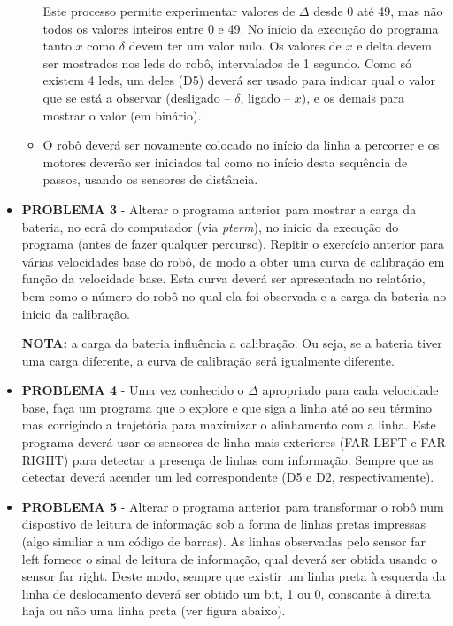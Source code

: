 \documentclass[a4paper, 12pt, onecolumn, oneside]{report}
\begin{document}
\begin{itemize}
\begin{itemize}
Este processo permite experimentar valores de $ \Delta $ desde 0 até 49, mas não todos os valores inteiros entre 0 e 49. No início da execução do programa tanto $ x $ como $ \delta $ devem ter um valor nulo.
Os valores de $ x $ e delta devem ser mostrados nos leds do robô, intervalados de 1 segundo. Como só existem 4 leds, um deles (D5) deverá ser usado para indicar qual o valor que se está a observar (desligado – $ \delta $, ligado – $ x $), e os demais para mostrar o valor (em binário).

\item O robô deverá ser novamente colocado no início da linha a percorrer e os motores deverão ser iniciados tal como no início desta sequência de passos, usando os sensores de distância. 




\end{itemize}


  \item \textbf{PROBLEMA 3} - Alterar o programa anterior para mostrar a carga da bateria, no ecrã do computador (via \emph{pterm}), no início da execução do programa (antes de fazer qualquer percurso).
Repitir o exercício anterior para várias velocidades base do robô, de modo a obter uma curva de calibração em função da velocidade base. Esta curva deverá ser apresentada no relatório, bem como o número do robô no qual ela foi observada e a carga da bateria no inicio da calibração.

\textbf{NOTA:} a carga da bateria influência a calibração. Ou seja, se a bateria tiver uma carga diferente, a curva de calibração será igualmente diferente.


\item \textbf{PROBLEMA 4} - Uma vez conhecido o $ \Delta $ apropriado para cada velocidade base, faça um programa que o explore e que siga a linha até ao seu término mas corrigindo a trajetória para maximizar o alinhamento com a linha. Este programa deverá usar os sensores de linha mais exteriores (FAR LEFT e FAR RIGHT) para detectar a presença de linhas com informação. Sempre que as detectar deverá acender um led correspondente (D5 e D2, respectivamente). 
  
 \item \textbf{PROBLEMA 5} - Alterar o programa anterior para transformar o robô num dispostivo de leitura de informação sob a forma de linhas pretas impressas (algo similiar a um código de barras). As linhas observadas pelo sensor far left fornece o sinal de leitura de informação, qual deverá ser obtida usando o sensor far right. Deste modo, sempre que existir um linha preta à esquerda da linha de deslocamento deverá ser obtido um bit, 1 ou 0, consoante à direita haja ou não uma linha preta (ver figura abaixo). 


\end{itemize}
\end{document}

